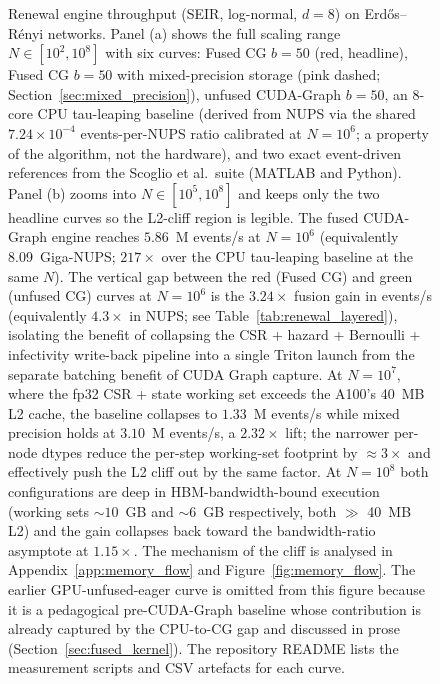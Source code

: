 \documentclass[a4paper,fleqn]{cas-sc}
\theoremstyle{definition}
\theoremstyle{remark}
\begin{document}
\begin{figure}[!htbp]
\centering

\caption{Renewal engine throughput (SEIR, log-normal, $d{=}8$) on Erd\H{o}s--R\'{e}nyi networks. Panel (a) shows the full scaling range $N \in [10^2, 10^8]$ with six curves: Fused CG $b{=}50$ (red, headline), Fused CG $b{=}50$ with mixed-precision storage (pink dashed; Section~\ref{sec:mixed_precision}), unfused CUDA-Graph $b{=}50$, an 8-core CPU tau-leaping baseline (derived from NUPS via the shared $7.24 \times 10^{-4}$ events-per-NUPS ratio calibrated at $N=10^6$; a property of the algorithm, not the hardware), and two exact event-driven references from the Scoglio et al.\ suite (MATLAB and Python). Panel (b) zooms into $N \in [10^5, 10^8]$ and keeps only the two headline curves so the L2-cliff region is legible. The fused CUDA-Graph engine reaches $5.86$~M events/s at $N=10^6$ (equivalently 8.09~Giga-NUPS; $217\times$ over the CPU tau-leaping baseline at the same $N$). The vertical gap between the red (Fused CG) and green (unfused CG) curves at $N = 10^6$ is the $3.24\times$ fusion gain in events/s (equivalently $4.3\times$ in NUPS; see Table~\ref{tab:renewal_layered}), isolating the benefit of collapsing the CSR + hazard + Bernoulli + infectivity write-back pipeline into a single Triton launch from the separate batching benefit of CUDA Graph capture. At $N=10^7$, where the fp32 CSR + state working set exceeds the A100's 40~MB L2 cache, the baseline collapses to $1.33$~M events/s while mixed precision holds at $3.10$~M events/s, a $\mathbf{2.32\times}$ lift; the narrower per-node dtypes reduce the per-step working-set footprint by $\approx 3\times$ and effectively push the L2 cliff out by the same factor. At $N=10^8$ both configurations are deep in HBM-bandwidth-bound execution (working sets $\sim 10$~GB and $\sim 6$~GB respectively, both $\gg$ 40~MB L2) and the gain collapses back toward the bandwidth-ratio asymptote at $1.15\times$. The mechanism of the cliff is analysed in Appendix~\ref{app:memory_flow} and Figure~\ref{fig:memory_flow}. The earlier GPU-unfused-eager curve is omitted from this figure because it is a pedagogical pre-CUDA-Graph baseline whose contribution is already captured by the CPU-to-CG gap and discussed in prose (Section~\ref{sec:fused_kernel}). The repository README lists the measurement scripts and CSV artefacts for each curve.}
\label{fig:throughput_renewal}
\end{figure}
\end{document}
